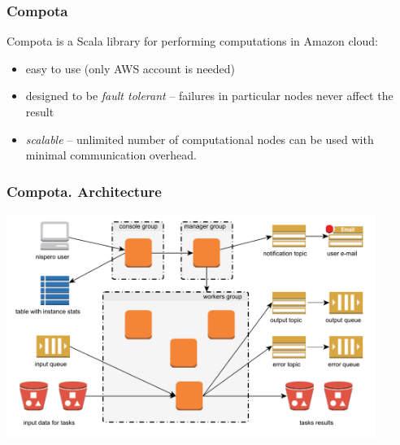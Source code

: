 \documentclass{beamer}
\begin{document}




\begin{frame}
\frametitle{Compota}
Compota is a Scala library for performing computations in Amazon cloud:
\begin{itemize}
  \item easy to use (only AWS account is needed)
  \item designed to be \textit{fault tolerant} -- failures in particular nodes never affect the result
  \item \textit{scalable} -- unlimited number of computational nodes can be used with minimal communication overhead.
\end{itemize}
\end{frame}


\begin{frame}
\frametitle{Compota. Architecture}
\hspace{0.05\textwidth}
\includegraphics[width=0.9\textwidth]{architecture.pdf}
\hspace{0.05\textwidth}

\end{frame}
\end{document}
